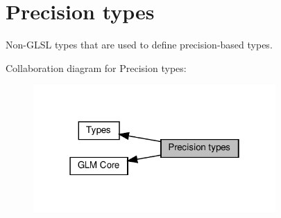 \hypertarget{group__core__precision}{}\section{Precision types}
\label{group__core__precision}


Non-\/\+G\+L\+SL types that are used to define precision-\/based types.  


Collaboration diagram for Precision types\+:\nopagebreak
\begin{figure}[H]
\begin{center}
\leavevmode
\includegraphics[width=262pt]{group__core__precision}
\end{center}
\end{figure}
